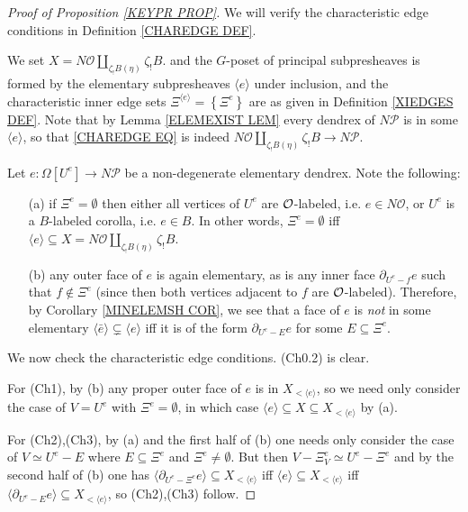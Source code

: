 \documentclass[a4paper,10pt
,draft
]{article}%
\renewcommand{\1}{\eta}%
\begin{document}
\begin{proof}[Proof of Proposition \ref{KEYPR PROP}]

We will verify the characteristic edge conditions in Definition \ref{CHAREDGE DEF}.

We set $X = N \mathcal{O} \amalg_{\zeta_!B (\eta)} \zeta_!B$.  %
and the $G$-poset of principal subpresheaves is formed by the 
elementary subpresheaves 
$\langle e \rangle$
under inclusion, and the characteristic inner edge sets
$\Xi^{\langle e \rangle} = \left\{\Xi^{e}\right\}$ are as given in Definition \ref{XIEDGES DEF}.
Note that by Lemma \ref{ELEMEXIST LEM}
every dendrex of $N \mathcal{P}$ is in some 
$\langle e \rangle$, so that
\eqref{CHAREDGE EQ} is indeed
$N \mathcal{O} \amalg_{\zeta_!B (\eta)} \zeta_!B \to N \mathcal{P}$.



Let $e\colon \Omega[U^e] \to N \mathcal{P}$
be a non-degenerate elementary dendrex. Note the following: 
\begin{itemize}
\item[(a)] if $\Xi^e = \emptyset$ then 
either all vertices of $U^e$ are $\mathcal{O}$-labeled, i.e. $e \in N \mathcal{O}$, or $U^e$ is a $B$-labeled corolla, i.e. $e \in B$.
In other words, $\Xi^e = \emptyset$ iff 
$\langle e \rangle \subseteq X = N \mathcal{O} \amalg_{\zeta_!B (\eta)} \zeta_!B$.
\item[(b)] any outer face of $e$ is again elementary,
as is any inner face $\partial_{U^e-f} e$ such that $f \not \in \Xi^e$
(since then both vertices adjacent to $f$ are $\mathcal{O}$-labeled).
Therefore, by Corollary \ref{MINELEMSH COR},
we see that a face of $e$ is \emph{not} in
some elementary $\langle \bar{e} \rangle \subsetneq \langle e \rangle$
iff it is of the form
$\partial_{U^e - E} e$
for some $E \subseteq \Xi^e$.
\end{itemize}


We now check the characteristic edge conditions. (Ch0.2) is clear.

For (Ch1), by (b) any proper outer face of $e$ is in $X_{<\langle e\rangle}$, so we need only consider the case of
$V=U^e$ with $\Xi^e=\emptyset$, in which case
$\langle e \rangle \subseteq X \subseteq X_{<\langle e\rangle}$ by (a).

For (Ch2),(Ch3), by (a) and the first half of (b) one needs only consider the case of
$V \simeq U^e - E$ where $E \subseteq \Xi^e$ and $\Xi^e \neq \emptyset$.
But then
$V - \Xi^e_V \simeq U^e- \Xi^e$
and by the second half of (b)
one has
$\langle \partial_{U^e-\Xi^e}e \rangle \subseteq  X_{<\langle e\rangle}$
iff
$\langle e \rangle \subseteq  X_{<\langle e\rangle}$
iff
$\langle \partial_{U^e-E}e \rangle \subseteq  X_{<\langle e\rangle}$,
so (Ch2),(Ch3) follow.



\end{proof}
\end{document}
